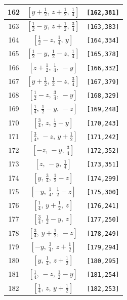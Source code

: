 \documentclass[fleqn,8pt]{jsarticle}
\begin{document}
\begin{longtable}{ccc}
162 & $\left[ y + \frac{1}{2},\, z + \frac{1}{2},\, \frac{1}{4} \right]$ & {\tt [162,381]} \\ \hline
163 & $\left[ \frac{1}{2} - y,\, z + \frac{1}{2},\, \frac{3}{4} \right]$ & {\tt [163,383]} \\ \hline
164 & $\left[ \frac{1}{2} - z,\, \frac{1}{4},\, y \right]$ & {\tt [164,334]} \\ \hline
165 & $\left[ \frac{1}{2} - y,\, \frac{1}{2} - z,\, \frac{1}{4} \right]$ & {\tt [165,378]} \\ \hline
166 & $\left[ z + \frac{1}{2},\, \frac{1}{4},\, - y \right]$ & {\tt [166,332]} \\ \hline
167 & $\left[ y + \frac{1}{2},\, \frac{1}{2} - z,\, \frac{3}{4} \right]$ & {\tt [167,379]} \\ \hline
168 & $\left[ \frac{1}{2} - z,\, \frac{3}{4},\, - y \right]$ & {\tt [168,329]} \\ \hline
169 & $\left[ \frac{1}{4},\, \frac{1}{2} - y,\, - z \right]$ & {\tt [169,248]} \\ \hline
170 & $\left[ \frac{3}{4},\, z,\, \frac{1}{2} - y \right]$ & {\tt [170,243]} \\ \hline
171 & $\left[ \frac{3}{4},\, - z,\, y + \frac{1}{2} \right]$ & {\tt [171,242]} \\ \hline
172 & $\left[ - z,\, - y,\, \frac{3}{4} \right]$ & {\tt [172,352]} \\ \hline
173 & $\left[ z,\, - y,\, \frac{1}{4} \right]$ & {\tt [173,351]} \\ \hline
174 & $\left[ y,\, \frac{3}{4},\, \frac{1}{2} - z \right]$ & {\tt [174,299]} \\ \hline
175 & $\left[ - y,\, \frac{1}{4},\, \frac{1}{2} - z \right]$ & {\tt [175,300]} \\ \hline
176 & $\left[ \frac{1}{4},\, y + \frac{1}{2},\, z \right]$ & {\tt [176,241]} \\ \hline
177 & $\left[ \frac{3}{4},\, \frac{1}{2} - y,\, z \right]$ & {\tt [177,250]} \\ \hline
178 & $\left[ \frac{3}{4},\, y + \frac{1}{2},\, - z \right]$ & {\tt [178,249]} \\ \hline
179 & $\left[ - y,\, \frac{3}{4},\, z + \frac{1}{2} \right]$ & {\tt [179,294]} \\ \hline
180 & $\left[ y,\, \frac{1}{4},\, z + \frac{1}{2} \right]$ & {\tt [180,295]} \\ \hline
181 & $\left[ \frac{1}{4},\, - z,\, \frac{1}{2} - y \right]$ & {\tt [181,254]} \\ \hline
182 & $\left[ \frac{1}{4},\, z,\, y + \frac{1}{2} \right]$ & {\tt [182,253]} \\ \hline

\end{longtable}
\end{document}
